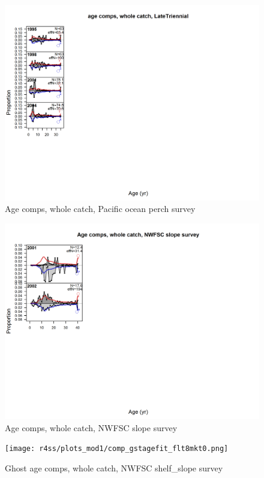 \documentclass[12pt,]{article}
\begin{document}
\begin{figure}
\centering
\includegraphics{r4ss/plots_mod1/comp_agefit_flt4mkt0.png}
\caption{Age comps, whole catch, Pacific ocean perch survey
\label{fig:age_fits}}
\end{figure}

\begin{figure}
\centering
\includegraphics{r4ss/plots_mod1/comp_agefit_flt7mkt0.png}
\caption{Age comps, whole catch, NWFSC slope survey
\label{fig:age_fits}}
\end{figure}

\begin{figure}
\centering
\texttt{[image: r4ss/plots\_mod1/comp\_gstagefit\_flt8mkt0.png]}
\caption{Ghost age comps, whole catch, NWFSC shelf\_slope survey
\label{fig:age_fits}}
\end{figure}
\end{document}
